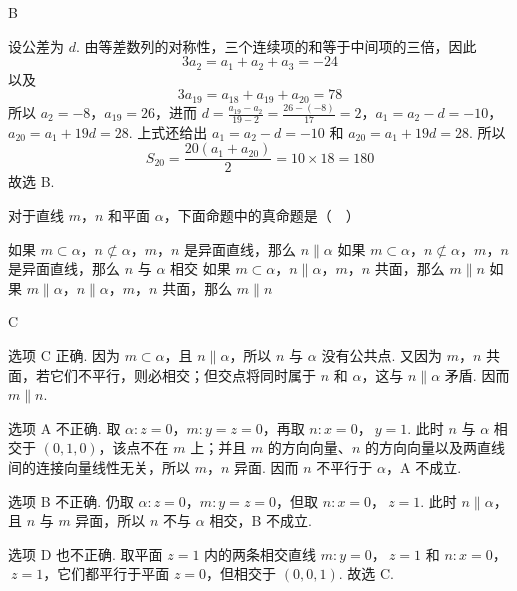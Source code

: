 \begin{answer}
B
\end{answer}

\begin{solution}
设公差为 \(d\). 由等差数列的对称性，三个连续项的和等于中间项的三倍，因此
\[
3a_2=a_1+a_2+a_3=-24
\]
以及
\[
3a_{19}=a_{18}+a_{19}+a_{20}=78
\]
所以 \(a_2=-8\)，\(a_{19}=26\)，进而
\(d=\frac{a_{19}-a_2}{19-2}=\frac{26-(-8)}{17}=2\)，\(a_1=a_2-d=-10\)，\(a_{20}=a_1+19d=28\).
上式还给出 \(a_1=a_2-d=-10\) 和 \(a_{20}=a_1+19d=28\).
所以
\[
S_{20}=\frac{20(a_{1}+a_{20})}{2}=10\times18=180
\]
故选 B.
\end{solution}

\begin{problem}
对于直线 \(m\)，\(n\) 和平面 \(\alpha\)，下面命题中的真命题是（\(\quad\)）

\choices
    {如果 \(m \subset \alpha\)，\(n \not\subset \alpha\)，\(m\)，\(n\) 是异面直线，那么 \(n \parallel \alpha\)}
    {如果 \(m \subset \alpha\)，\(n \not\subset \alpha\)，\(m\)，\(n\) 是异面直线，那么 \(n\) 与 \(\alpha\) 相交}
    {如果 \(m \subset \alpha\)，\(n \parallel \alpha\)，\(m\)，\(n\) 共面，那么 \(m \parallel n\)}
    {如果 \(m \parallel \alpha\)，\(n \parallel \alpha\)，\(m\)，\(n\) 共面，那么 \(m \parallel n\)}
\end{problem}

\begin{answer}
C
\end{answer}

\begin{solution}
选项 C 正确. 因为 \(m\subset\alpha\)，且 \(n\parallel\alpha\)，所以 \(n\) 与 \(\alpha\) 没有公共点. 又因为 \(m\)，\(n\) 共面，若它们不平行，则必相交；但交点将同时属于 \(n\) 和 \(\alpha\)，这与 \(n\parallel\alpha\) 矛盾. 因而 \(m\parallel n\).

选项 A 不正确. 取 \(\alpha:z=0\)，\(m:y=z=0\)，再取 \(n:x=0\)，\(\ y=1\). 此时 \(n\) 与 \(\alpha\) 相交于 \((0,1,0)\)，该点不在 \(m\) 上；并且 \(m\) 的方向向量、\(n\) 的方向向量以及两直线间的连接向量线性无关，所以 \(m\)，\(n\) 异面. 因而 \(n\) 不平行于 \(\alpha\)，A 不成立.

选项 B 不正确. 仍取 \(\alpha:z=0\)，\(m:y=z=0\)，但取 \(n:x=0\)，\(\ z=1\). 此时 \(n\parallel\alpha\)，且 \(n\) 与 \(m\) 异面，所以 \(n\) 不与 \(\alpha\) 相交，B 不成立.

选项 D 也不正确. 取平面 \(z=1\) 内的两条相交直线 \(m:y=0\)，\(\ z=1\) 和 \(n:x=0\)，\(\ z=1\)，它们都平行于平面 \(z=0\)，但相交于 \((0,0,1)\). 故选 C.
\end{solution}

